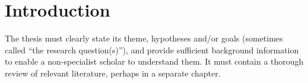 \section{Introduction}
The thesis must clearly state its theme, hypotheses and/or goals (sometimes called “the research question(s)”), and provide sufficient background information to enable a non-specialist scholar to understand them. It must contain a thorough review of relevant literature, perhaps in a separate chapter.
